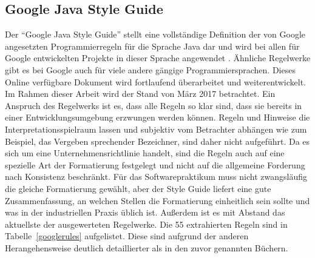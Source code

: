 \documentclass[da,ngerman]{stthesis}
\begin{document}
			\subsection{Google Java Style Guide}
				Der "`Google Java Style Guide"' stellt eine vollständige Definition der von Google angesetzten Programmierregeln für die Sprache Java dar und wird bei allen für Google entwickelten Projekte in dieser Sprache angewendet  \cite{GoogleStyleGuide}. Ähnliche Regelwerke gibt es bei Google auch für viele andere gängige Programmiersprachen. Dieses Online verfügbare Dokument wird fortlaufend überarbeitet und weiterentwickelt. Im Rahmen dieser Arbeit wird der Stand von März 2017 betrachtet. Ein Anspruch des Regelwerks ist es, dass alle Regeln so klar sind, dass sie bereits in einer Entwicklungsumgebung erzwungen werden können. Regeln und Hinweise die Interpretationsspielraum lassen und subjektiv vom Betrachter abhängen wie zum Beispiel, das Vergeben sprechender Bezeichner, sind daher nicht aufgeführt. \newline
				Da es sich um eine Unternehmensrichtlinie handelt, sind die Regeln auch auf eine spezielle Art der Formatierung festgelegt und nicht auf die allgemeine Forderung nach Konsistenz beschränkt. Für das Softwarepraktikum muss nicht zwangsläufig die gleiche Formatierung gewählt, aber der Style Guide liefert eine gute Zusammenfassung, an welchen Stellen die Formatierung einheitlich sein sollte und was in der industriellen Praxis üblich ist. Außerdem ist es mit Abstand das aktuellste der ausgewerteten Regelwerke. Die 55 extrahierten Regeln sind in Tabelle~\ref{googlerules} aufgelistet. Diese sind aufgrund der anderen Herangehensweise deutlich detaillierter als in den zuvor genannten Büchern.
\end{document}
